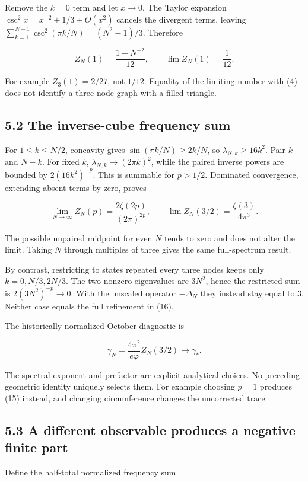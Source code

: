 \documentclass[11pt,a4paper]{article}
\begin{document}
Remove the $k=0$ term and let $x\to0$. The Taylor expansion
$\csc^2x=x^{-2}+1/3+O(x^2)$ cancels the divergent terms, leaving
$\sum_{k=1}^{N-1}\csc^2(\pi k/N)=(N^2-1)/3$. Therefore


\[
Z_N(1)=\frac{1-N^{-2}}{12},\qquad
\lim Z_N(1)=\frac1{12}. \tag{15}
\]

For example $Z_3(1)=2/27$, not $1/12$. Equality of the limiting number with (4) does not identify a three-node graph with a filled triangle.


\subsection*{5.2 The inverse-cube frequency sum}

For $1\leq k\leq N/2$, concavity gives $\sin(\pi k/N)\geq2k/N$, so $\lambda_{N,k}\geq16k^2$. Pair $k$ and $N-k$. For fixed $k$, $\lambda_{N,k}\to(2\pi k)^2$, while the paired inverse powers are bounded by $2(16k^2)^{-p}$. This is summable for $p>1/2$. Dominated convergence, extending absent terms by zero, proves


\[
\lim_{N\to\infty}Z_N(p)=\frac{2\zeta(2p)}{(2\pi)^{2p}},
\qquad
\lim Z_N(3/2)=\frac{\zeta(3)}{4\pi^3}. \tag{16}
\]

The possible unpaired midpoint for even $N$ tends to zero and does not alter the limit. Taking $N$ through multiples of three gives the same full-spectrum result.


By contrast, restricting to states repeated every three nodes keeps only $k=0,N/3,2N/3$. The two nonzero eigenvalues are $3N^2$, hence the restricted sum is $2(3N^2)^{-p}\to0$. With the unscaled operator $-\Delta_N$ they instead stay equal to $3$. Neither case equals the full refinement in (16).


The historically normalized October diagnostic is


\[
\gamma_N=\frac{4\pi^2}{e\varphi}Z_N(3/2)
\longrightarrow\gamma_*. \tag{17}
\]

The spectral exponent and prefactor are explicit analytical choices. No preceding geometric identity uniquely selects them. For example choosing $p=1$ produces (15) instead, and changing circumference changes the uncorrected trace.


\subsection*{5.3 A different observable produces a negative finite part}

Define the half-total normalized frequency sum
\end{document}
